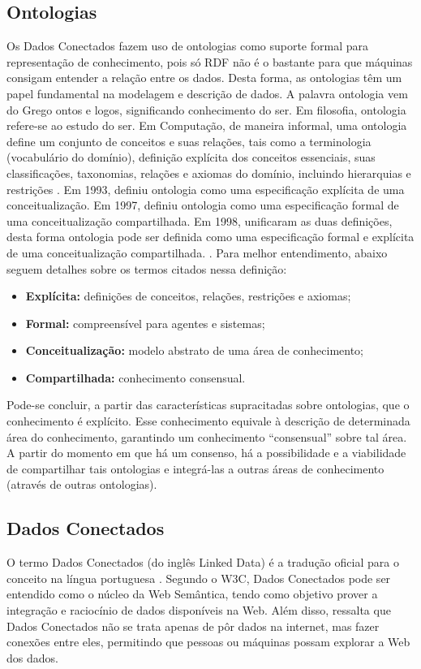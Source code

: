 \subsection{Ontologias}
Os Dados Conectados fazem uso de ontologias como suporte formal para representação de conhecimento, pois só RDF não é o bastante para que máquinas consigam entender a relação entre os dados. Desta forma, as ontologias têm um papel fundamental na modelagem e descrição de dados. A palavra ontologia vem do Grego ontos e logos, significando conhecimento do ser. Em filosofia, ontologia refere-se ao estudo do ser. 
Em Computação, de maneira informal, uma ontologia define um conjunto de conceitos e suas relações, tais como a terminologia (vocabulário do domínio), definição explícita dos conceitos essenciais, suas classificações, taxonomias, relações e axiomas do domínio, incluindo hierarquias e restrições \cite{deved2006semantic}. Em 1993, \citeauthor{gruber1993translation} definiu ontologia como uma especificação explícita de uma conceitualização. Em 1997, \citeauthor{borstw1997construction} definiu ontologia como uma especificação formal de uma conceitualização compartilhada. Em 1998, \citeauthor{studer1998knowledge} unificaram as duas definições, desta forma ontologia pode ser definida como uma especificação formal e explícita de uma conceitualização compartilhada.
. Para melhor entendimento, abaixo seguem detalhes sobre os termos citados nessa definição: 
\begin{itemize}
	\item \textbf{Explícita:} definições de conceitos, relações, restrições e axiomas; 
	\item \textbf{Formal:} compreensível para agentes e sistemas; 
	\item \textbf{Conceitualização:} modelo abstrato de uma área de conhecimento; 
	\item \textbf{Compartilhada:} conhecimento consensual. 
\end{itemize}
Pode-se concluir, a partir das características supracitadas sobre ontologias, que o conhecimento é explícito. Esse conhecimento equivale à descrição de determinada área do conhecimento, garantindo um conhecimento “consensual” sobre tal área. A partir do momento em que há um consenso, há a possibilidade e a viabilidade de compartilhar tais ontologias e integrá-las a outras áreas de conhecimento (através de outras ontologias).

\subsection{Dados Conectados}
O termo Dados Conectados (do inglês Linked Data) é a tradução oficial para o conceito na língua portuguesa \cite{Isotani2015}. Segundo o W3C, Dados Conectados pode ser entendido como o núcleo da Web Semântica, tendo como objetivo prover a integração e raciocínio de dados disponíveis na Web. Além disso,  ressalta que Dados Conectados não se trata apenas de pôr dados na internet, mas fazer conexões entre eles, permitindo que pessoas ou máquinas possam explorar a Web dos dados.

